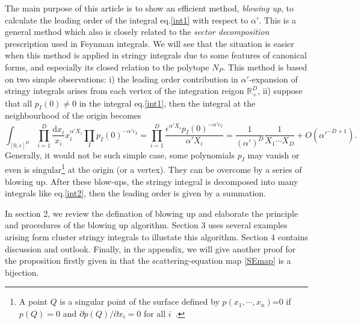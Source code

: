\documentclass[12pt]{article}
\theoremstyle{definition}
\theoremstyle{plain}
\newcommand{\dif}{\mathrm{d}} %
\begin{document}
The main purpose of this article is to show an efficient method, {\it{blowing up}}, %
to calculate the leading order of the integral eq.\eqref{int1} with respect to $\alpha'$. This is a general method which also is closely related to the {\it sector decomposition} prescription \cite{} used in Feynman integrals. We will see that the situation is easier when this method is applied in stringy integrals due to some features of canonical forms, and especially its closed relation to the polytope $N_{P}$. This method is based on two simple observations: i) the leading order contribution in $\alpha'$-expansion of stringy integrals arises from each vertex of the integration reigon $\mathds{R}_{+}^{D}$, ii) suppose that all $p_I(0)\neq 0$ in the integral eq.\eqref{int1}, then the integral at the neighbourhood of the origin becomes 
\begin{equation}\label{int2}
	\int_{[0,\epsilon]^D}\prod_{i=1}^D\frac{\dif x_i}{x_i}x_i^{\alpha' X_i} \prod_{I}p_{I}(0)^{-\alpha' c_{I}}
	=\prod_{i=1}^D\frac{\epsilon^{\alpha' X_i}p_{I}(0)^{-\alpha' c_{I}}}{\alpha' X_i}
	= \frac{1}{(\alpha')^D}\frac{1}{X_1\cdots X_D}+O(\alpha'^{-D+1}).
\end{equation}
Generally, it would not be such simple case, some polynomials $p_{I}$ may vanish or even is singular\footnote{A point $Q$ is a singular point of the surface defined by $p(x_{1},\cdots,x_{n})$=0 if $p(Q)=0$ and $\partial p(Q)/\partial x_{i} =0$ for all $i$~\cite{}. } at the origin (or a vertex).
They can be overcome by a series of blowing up. After these blow-ups, the 
stringy integral is decomposed into many integrals like eq.\eqref{int2}, then the leading order is given by a summation.


In section 2, we review the defination of blowing up and elaborate the principle and procedures of the blowing up algorithm. Section 3 uses several examples arising form cluster stringy integrals to illustate this algorithm. Section 4 contains discussion and outlook. Finally, in the appendix, we will give another proof for the proposition firstly given in \cite{Arkani-Hamed:2017tmz} that the scattering-equation map \eqref{SEmap} is a bijection. 
\end{document}
